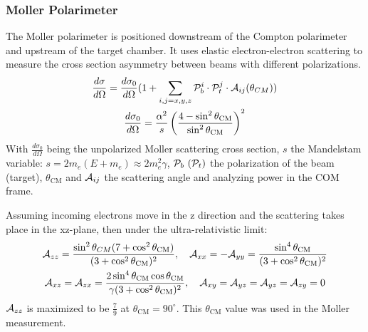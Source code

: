 \subsubsection{Moller Polarimeter}
The Moller polarimeter is positioned downstream of the Compton polarimeter and upstream 
of the target chamber. It uses elastic electron-electron scattering to measure the
cross section asymmetry between beams with different polarizations. 
\begin{equation}
    \begin{gathered}
	\frac{d\sigma}{d\Omega} = \frac{d\sigma_0}{d\Omega} (1 + \sum_{i,j=x,y,z} \mathcal{P}_b^i \cdot \mathcal{P}_t^j \cdot \mathcal{A}_{ij}(\theta_{CM})) \\
	\frac{d\sigma_0}{d\Omega} = \frac{\alpha^2}{s} \left( \frac{4 - \sin^2\theta_{\mathrm{CM}}}{\sin^2\theta_{\mathrm{CM}}}\right)^2 
    \end{gathered}
    \label{eq:moller_xsection}
\end{equation}
With $\frac{d\sigma_0}{d\Omega}$ being the unpolarized Moller scattering cross section,
$s$ the Mandelstam variable: $s = 2m_e(E+m_e) \approx 2m_e^2\gamma$,
$\mathcal{P}_b \ (\mathcal{P}_t)$ the polarization of the beam (target),
$\theta_{\mathrm{CM}}$ and $\mathcal{A}_{ij}$ the scattering angle and analyzing power in the COM frame. 

Assuming incoming electrons move in the z direction and the scattering takes place
in the xz-plane, then under the ultra-relativistic limit:
\begin{equation}
    \begin{gathered}
	\mathcal{A}_{zz} = \frac{\sin^2\theta_{CM} (7 + \cos^2\theta_{\mathrm{CM}})}{(3+\cos^2\theta_{\mathrm{CM}})^2},
	\quad
	\mathcal{A}_{xx} = -\mathcal{A}_{yy} = \frac{\sin^4\theta_{\mathrm{CM}}}{(3+\cos^2\theta_{\mathrm{CM}})^2}	\\
	\mathcal{A}_{xz} = \mathcal{A}_{zx} = \frac{2\sin^4\theta_{\mathrm{CM}}\cos\theta_{\mathrm{CM}}}{\gamma(3+\cos^2\theta_{\mathrm{CM}})^2},
	\quad
	\mathcal{A}_{xy} = \mathcal{A}_{yz} = \mathcal{A}_{yz} = \mathcal{A}_{zy} = 0
    \end{gathered}
\end{equation}
$\mathcal{A}_{zz}$ is maximized to be $\frac{7}{9}$ at $\theta_{\mathrm{CM}} = 90^\circ$.
This $\theta_{\text{CM}}$ value was used in the Moller measurement.

